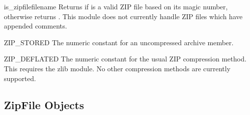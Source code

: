 \begin{funcdesc}{is_zipfile}{filename}
  Returns  if  is a valid ZIP file based on its magic
  number, otherwise returns .  This module does not currently
  handle ZIP files which have appended comments.
\end{funcdesc}

\begin{datadesc}{ZIP_STORED}
  The numeric constant for an uncompressed archive member.
\end{datadesc}

\begin{datadesc}{ZIP_DEFLATED}
  The numeric constant for the usual ZIP compression method.  This
  requires the zlib module.  No other compression methods are
  currently supported.
\end{datadesc}


\begin{seealso}

\end{seealso}


\subsection{ZipFile Objects \label{zipfile-objects}}

